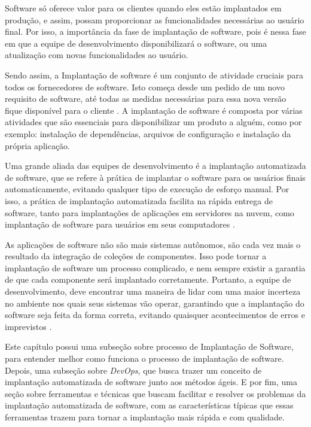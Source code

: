 Software só oferece valor para os clientes quando eles estão implantados em produção,
e assim, possam proporcionar as funcionalidades necessárias ao usuário final. Por
 isso, a importância da fase de implantação de software, pois é nessa fase em que a equipe
de desenvolvimento disponibilizará o software, ou uma atualização com novas funcionalidades
ao usuário. 

Sendo assim, a Implantação de software é um conjunto de atividade cruciais
para todos os fornecedores de software. Isto começa desde um pedido de um novo requisito
de software, até todas as medidas necessárias para essa nova versão fique disponível
para o cliente \cite{5741269}. A implantação de software é composta por várias
atividades que são essenciais para disponibilizar um produto a alguém, como por exemplo:
instalação de dependências, arquivos de configuração e instalação da própria aplicação.

Uma grande aliada das equipes de desenvolvimento é a implantação automatizada de
software, que se refere à prática de implantar o software para os usuários finais
automaticamente, evitando qualquer tipo de execução de esforço manual. Por isso,
a prática de implantação automatizada facilita na rápida entrega de software, tanto
para implantações de aplicações em servidores na nuvem, como implantação de software
para usuários em seus computadores \cite{7284592}.

As aplicações de software não são mais sistemas autônomos, 
são cada vez mais o resultado da integração de coleções de
componentes. Isso pode tornar a implantação de software um processo complicado, e
nem sempre existir a garantia de que cada componente será implantado corretamente.
Portanto, a equipe de desenvolvimento, deve encontrar uma maneira de lidar
com uma maior incerteza no ambiente nos quais seus sistemas vão operar, garantindo
que a implantação do software seja feita da forma correta, evitando quaisquer acontecimentos
de erros e imprevistos \cite{deployment1998}.

Este capítulo possui uma subseção sobre
processo de Implantação de Software, para entender melhor como funciona o processo
de implantação
de software. Depois, uma subseção sobre \textit{DevOps}, que busca trazer um 
conceito de implantação
automatizada de software junto aos métodos ágeis. E por fim, uma seção sobre
ferramentas e técnicas que buscam facilitar e resolver os problemas da
implantação automatizada de software, com as características típicas que essas
ferramentas trazem para tornar a implantação mais rápida e com qualidade.

